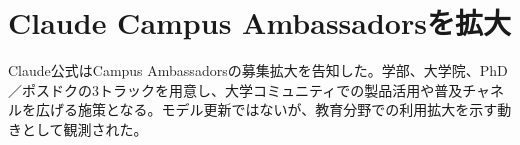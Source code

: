 \section{Claude Campus Ambassadorsを拡大}
Claude公式はCampus Ambassadorsの募集拡大を告知した。学部、大学院、PhD／ポスドクの3トラックを用意し、大学コミュニティでの製品活用や普及チャネルを広げる施策となる。モデル更新ではないが、教育分野での利用拡大を示す動きとして観測された。
